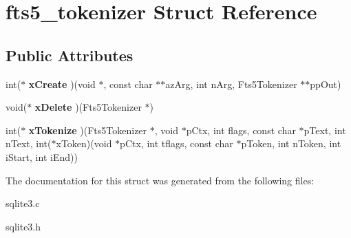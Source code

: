 \hypertarget{structfts5__tokenizer}{}\section{fts5\+\_\+tokenizer Struct Reference}
\label{structfts5__tokenizer}
\subsection*{Public Attributes}
\begin{DoxyCompactItemize}
\item 
int($\ast$ {\bfseries x\+Create} )(void $\ast$, const char $\ast$$\ast$az\+Arg, int n\+Arg, Fts5\+Tokenizer $\ast$$\ast$pp\+Out)\hypertarget{structfts5__tokenizer_ab0e73328047d3191668ecad51839873d}{}\label{structfts5__tokenizer_ab0e73328047d3191668ecad51839873d}

\item 
void($\ast$ {\bfseries x\+Delete} )(Fts5\+Tokenizer $\ast$)\hypertarget{structfts5__tokenizer_a5df6926b15f5ccbffdcdf635f2f76142}{}\label{structfts5__tokenizer_a5df6926b15f5ccbffdcdf635f2f76142}

\item 
int($\ast$ {\bfseries x\+Tokenize} )(Fts5\+Tokenizer $\ast$, void $\ast$p\+Ctx, int flags, const char $\ast$p\+Text, int n\+Text, int($\ast$x\+Token)(void $\ast$p\+Ctx, int tflags, const char $\ast$p\+Token, int n\+Token, int i\+Start, int i\+End))\hypertarget{structfts5__tokenizer_aca859d7c328ff545aef9a16c07a70ed4}{}\label{structfts5__tokenizer_aca859d7c328ff545aef9a16c07a70ed4}

\end{DoxyCompactItemize}


The documentation for this struct was generated from the following files\+:\begin{DoxyCompactItemize}
\item 
sqlite3.\+c\item 
sqlite3.\+h\end{DoxyCompactItemize}
